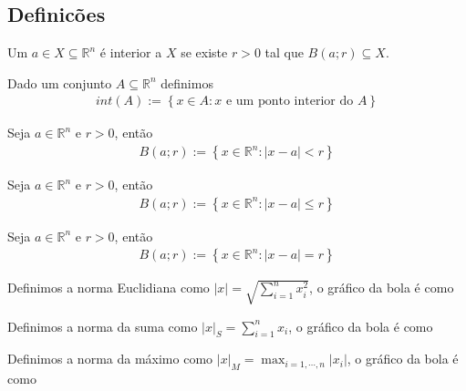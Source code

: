 \subsection{Definicões}
\begin{definition}
  Um $a\in X\subseteq \mathbb{R}^{n}$ é interior a $X$ se existe $r>0$ tal que $B(a;r)\subseteq X$. 
\end{definition}
\begin{definition}[Interior do $A$]
  Dado um conjunto $A\subseteq \mathbb{R}^{n}$ definimos
  \begin{align*}
    int(A):=\left\{x\in A: x\text{ e um ponto interior do }A\right\}
  \end{align*}
\end{definition}
\begin{definition}
  Seja $a\in \mathbb{R}^{n}$ e $r>0$, então 
  \begin{align*}
    B(a;r):=\left\{x\in \mathbb{R}^{n}:|x-a|<r\right\}
  \end{align*}
\end{definition}
\begin{definition}
  Seja $a\in \mathbb{R}^{n}$ e $r>0$, então 
  \begin{align*}
    B(a;r):=\left\{x\in \mathbb{R}^{n}:|x-a|\leq r\right\}
  \end{align*}
\end{definition}
\begin{definition}[Esfera]
  Seja $a\in \mathbb{R}^{n}$ e $r>0$, então 
  \begin{align*}
    B(a;r):=\left\{x\in \mathbb{R}^{n}:|x-a|=r\right\}
  \end{align*}
\end{definition}
\begin{example}
  Definimos a norma Euclidiana como $|x|=\sqrt{\sum_{i=1}^{n}x_i^2}$, o gráfico da bola é como
  \begin{center}
         
  \end{center}
\end{example}
\begin{example}
  Definimos a norma da suma como $|x|_{S}=\sum_{i=1}^{n}x_i$, o gráfico da bola é como
  \begin{center}
    
  \end{center}
\end{example}
\begin{example}
  Definimos a norma da máximo como $\displaystyle |x|_{M}=\max_{i=1,\cdots,n}|x_i|$, o gráfico da bola é como
  \begin{center}
    
  \end{center}
\end{example}
